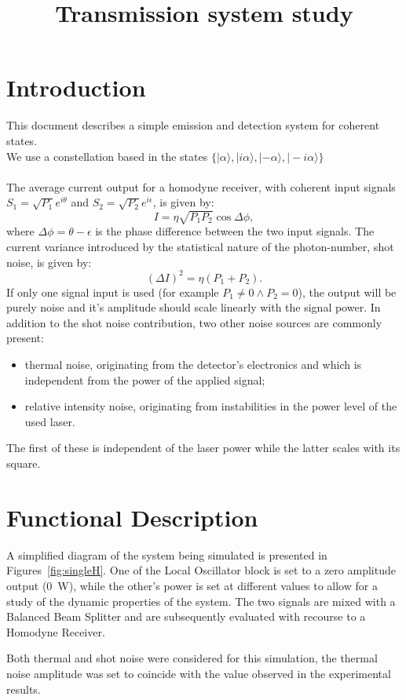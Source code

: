 \documentclass[a4paper]{article}
\title{Transmission system study}
\author{}
\date{}
\newcommand{\ket}[1]{|#1\rangle}
\begin{document}
\maketitle

\section{Introduction}\label{sec:intro}

This document describes a simple emission and detection system for coherent states.\\
We use a constellation based in the states $\{ \ket{\alpha}, \ket{i\alpha}, \ket{-\alpha}, \ket{-i \alpha} \}$\\
\\
The average current output for a homodyne receiver, with coherent input signals $S_1=\sqrt{P_1}e^{i\theta}$ and $S_2=\sqrt{P_2}e^{i\epsilon}$, is given by:
\begin{equation}
I=\eta\sqrt{P_1P_2}\cos\Delta\phi,
\end{equation}
where $\Delta\phi=\theta-\epsilon$ is the phase difference between the two input signals. The current variance introduced by the statistical nature of the photon-number, shot noise, is given by:
\begin{equation}
(\Delta I)^2=\eta(P_1+P_2).
\end{equation}
If only one signal input is used (for example $P_1\neq0\wedge P_2=0$), the output will be purely noise and it's amplitude should scale linearly with the signal power. In addition to the shot noise contribution, two other noise sources are commonly present: 
\begin{itemize}
\item thermal noise, originating from the detector’s electronics and which is independent from the power of the applied signal;
\item relative intensity noise, originating from instabilities in the power level of the used laser.
\end{itemize}
The first of these is independent of the laser power while the latter scales with its square.

\section{Functional Description}

A simplified diagram of the system being simulated is presented in Figures~\ref{fig:singleH}. One of the Local Oscillator block is set to a zero amplitude output (0~W), while the other's power is set at different values to allow for a study of the dynamic properties of the system. The two signals are mixed with a Balanced Beam Splitter and are subsequently evaluated with recourse to a Homodyne Receiver.
\par
Both thermal and shot noise were considered for this simulation, the thermal noise amplitude was set to coincide with the value observed in the experimental results.
\end{document}
